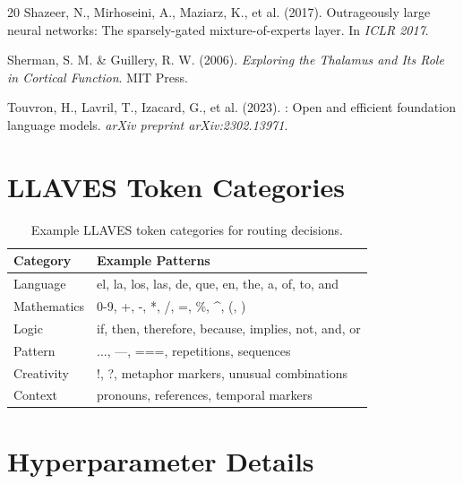 \documentclass[11pt,a4paper]{article}
\begin{document}
\begin{thebibliography}{20}
Shazeer, N., Mirhoseini, A., Maziarz, K., et al. (2017).
\newblock Outrageously large neural networks: The sparsely-gated mixture-of-experts layer.
\newblock In \emph{ICLR 2017}.

Sherman, S. M. \& Guillery, R. W. (2006).
\newblock \emph{Exploring the Thalamus and Its Role in Cortical Function}.
\newblock MIT Press.

Touvron, H., Lavril, T., Izacard, G., et al. (2023).
: Open and efficient foundation language models.
\newblock \emph{arXiv preprint arXiv:2302.13971}.

\end{thebibliography}

\appendix

\section{LLAVES Token Categories}
\label{app:llaves}

\begin{table}[h]
\centering
\small
\begin{tabular}{ll}
\toprule
\textbf{Category} & \textbf{Example Patterns} \\
\midrule
Language & el, la, los, las, de, que, en, the, a, of, to, and \\
Mathematics & 0-9, +, -, *, /, =, \%, \^{}, (, ) \\
Logic & if, then, therefore, because, implies, not, and, or \\
Pattern & ..., ---, ===, repetitions, sequences \\
Creativity & !, ?, metaphor markers, unusual combinations \\
Context & pronouns, references, temporal markers \\
\bottomrule
\end{tabular}
\caption{Example LLAVES token categories for routing decisions.}
\label{tab:llaves_categories}
\end{table}

\section{Hyperparameter Details}
\label{app:hyperparams}
\end{document}
